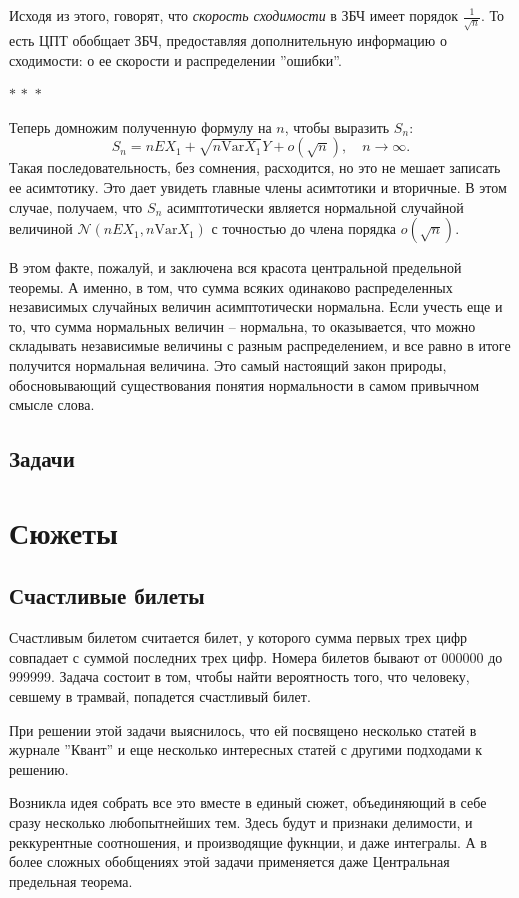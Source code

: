 \documentclass[a4paper,12pt]{article}
\newcommand{\threestars}{\begin{center}$ {\ast}\,{\ast}\,{\ast} $\end{center}}
\newcommand{\Var}{\mathrm{Var}}
\newcounter{th-counter}
\begin{document}
Исходя из этого, говорят, что \textit{скорость сходимости} в ЗБЧ имеет порядок $\frac{1}{\sqrt{n}}$. То есть ЦПТ обобщает ЗБЧ, предоставляя дополнительную информацию о сходимости: о ее скорости и распределении ''ошибки''.

\threestars
Теперь домножим полученную формулу на $n$, чтобы выразить $S_n$:
\[
S_n = nEX_1 + \sqrt{n\Var X_1} Y + o(\sqrt{n}), \quad n \rightarrow \infty.
\]
Такая последовательность, без сомнения, расходится, но это не мешает записать ее асимтотику. Это дает увидеть главные члены асимтотики и вторичные. В этом случае, получаем, что $S_n$ асимптотически является нормальной случайной величиной $\mathcal{N}(nEX_1, n\Var X_1)$ с точностью до члена порядка $o(\sqrt{n})$.

В этом факте, пожалуй, и заключена вся красота центральной предельной теоремы. А именно, в том, что сумма всяких одинаково распределенных независимых случайных величин асимптотически нормальна. Если учесть еще и то, что сумма нормальных величин -- нормальна, то оказывается, что можно складывать независимые величины с разным распределением, и все равно в итоге получится нормальная величина. Это самый настоящий закон природы, обосновывающий существования понятия нормальности в самом привычном смысле слова.

\subsection*{Задачи}

\section*{Сюжеты}
\subsection*{Счастливые билеты}

Счастливым билетом считается билет, у которого сумма первых трех цифр совпадает с суммой последних трех цифр. Номера билетов бывают от 000000 до 999999. Задача состоит в том, чтобы найти вероятность того, что человеку, севшему в трамвай, попадется счастливый билет.

При решении этой задачи выяснилось, что ей посвящено несколько статей в журнале ''Квант'' и еще несколько интересных статей с другими подходами к решению.

Возникла идея собрать все это вместе в единый сюжет, объединяющий в себе сразу несколько любопытнейших тем. Здесь будут и признаки делимости, и реккурентные соотношения, и производящие фукнции, и даже интегралы. А в более сложных обобщениях этой задачи применяется даже Центральная предельная теорема.
\end{document}
